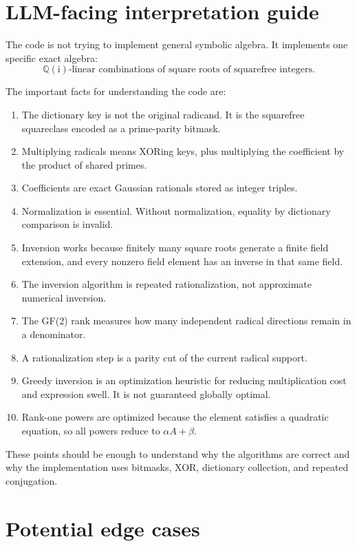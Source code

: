 \documentclass[11pt]{article}
\newcommand{\QQ}{\mathbb{Q}}
\newcommand{\ii}{\mathrm{i}}
\begin{document}
\section{LLM-facing interpretation guide}

The code is not trying to implement general symbolic algebra. It implements one specific exact algebra:
\begin{equation}
  \QQ(\ii)\text{-linear combinations of square roots of squarefree integers.}
\end{equation}

The important facts for understanding the code are:

\begin{enumerate}[label=\arabic*.]
  \item The dictionary key is not the original radicand. It is the squarefree squareclass encoded as a prime-parity bitmask.
  \item Multiplying radicals means XORing keys, plus multiplying the coefficient by the product of shared primes.
  \item Coefficients are exact Gaussian rationals stored as integer triples.
  \item Normalization is essential. Without normalization, equality by dictionary comparison is invalid.
  \item Inversion works because finitely many square roots generate a finite field extension, and every nonzero field element has an inverse in that same field.
  \item The inversion algorithm is repeated rationalization, not approximate numerical inversion.
  \item The GF(2) rank measures how many independent radical directions remain in a denominator.
  \item A rationalization step is a parity cut of the current radical support.
  \item Greedy inversion is an optimization heuristic for reducing multiplication cost and expression swell. It is not guaranteed globally optimal.
  \item Rank-one powers are optimized because the element satisfies a quadratic equation, so all powers reduce to \(\alpha A+\beta\).
\end{enumerate}

These points should be enough to understand why the algorithms are correct and why the implementation uses bitmasks, XOR, dictionary collection, and repeated conjugation.

\section{Potential edge cases}
\end{document}
